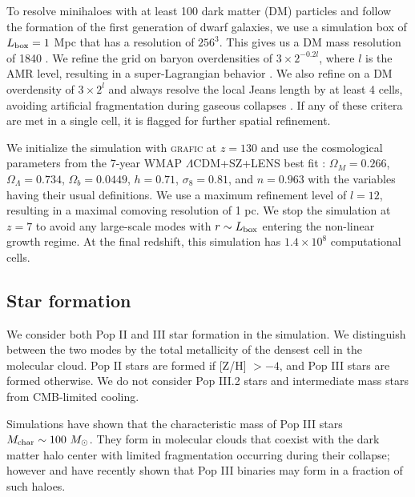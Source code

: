 \documentclass[useAMS,usenatbib]{mn2e}
\begin{document}
To resolve minihaloes with at least 100 dark matter (DM) particles and
follow the formation of the first generation of dwarf galaxies, we use
a simulation box of $L_{\rm box} = 1$ Mpc that has a resolution of
$256^3$.  This gives us a DM mass resolution of 1840 \Ms.  We refine
the grid on baryon overdensities of $3 \times 2^{-0.2l}$, where $l$ is
the AMR level, resulting in a super-Lagrangian behavior \citep[also
see][]{OShea08}.  We also refine on a DM overdensity of $3 \times 2^l$
and always resolve the local Jeans length by at least 4 cells,
avoiding artificial fragmentation during gaseous collapses
\citep{Truelove97}.  If any of these critera are met in a single cell,
it is flagged for further spatial refinement.

We initialize the simulation with \textsc{grafic}
\citep{Bertschinger01} at $z = 130$ and use the cosmological
parameters from the 7-year WMAP $\Lambda$CDM+SZ+LENS best fit
\citep{WMAP7}: $\Omega_M = 0.266$, $\Omega_\Lambda = 0.734$, $\Omega_b
= 0.0449$, $h = 0.71$, $\sigma_8 = 0.81$, and $n = 0.963$ with the
variables having their usual definitions.  We use a maximum refinement
level of $l = 12$, resulting in a maximal comoving resolution of 1 pc.
We stop the simulation at $z=7$ to avoid any large-scale modes with $r
\sim L_{\rm box}$ entering the non-linear growth regime.  At the final
redshift, this simulation has $1.4 \times 10^8$ computational cells.

\subsection{Star formation}

We consider both Pop II and III star formation in the simulation.  We
distinguish between the two modes by the total metallicity of the
densest cell in the molecular cloud.  Pop II stars are formed if [Z/H]
$> -4$, and Pop III stars are formed otherwise.  We do not consider
Pop III.2 stars and intermediate mass stars from CMB-limited cooling.

Simulations have shown that the characteristic mass of Pop III stars
$M_{\rm char} \sim 100~\Ms$.  They form in molecular clouds that
coexist with the dark matter halo center with limited fragmentation
occurring during their collapse; however \citet{2009Sci...325..601T}
and \citet{Stacy10_Binary} have recently shown that Pop III binaries
may form in a fraction of such haloes.
\end{document}
